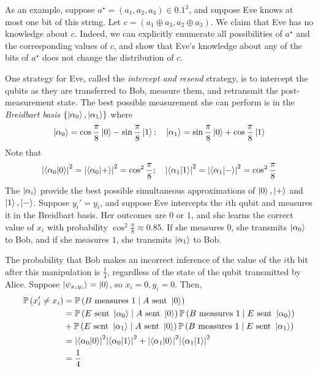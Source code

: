 As an example, suppose \( a^\star = (a_1, a_2, a_3) \in \qty{0,1}^3 \), and suppose Eve knows at most one bit of this string.
Let \( c = (a_1 \oplus a_3, a_2 \oplus a_3) \).
We claim that Eve has no knowledge about \( c \).
Indeed, we can explicitly enumerate all possibilities of \( a^\star \) and the corresponding values of \( c \), and show that Eve's knowledge about any of the bits of \( a^\star \) does not change the distribution of \( c \).

One strategy for Eve, called the \emph{intercept and resend} strategy, is to intercept the qubits as they are transferred to Bob, measure them, and retransmit the post-measurement state.
The best possible measurement she can perform is in the \emph{Breidbart basis} \( \qty{\ket{\alpha_0}, \ket{\alpha_1}} \) where
\[ \ket{\alpha_0} = \cos \frac{\pi}{8} \ket{0} - \sin \frac{\pi}{8} \ket{1};\quad \ket{\alpha_1} = \sin \frac{\pi}{8} \ket{0} + \cos \frac{\pi}{8} \ket{1} \]
Note that
\[ \abs{\ip{\alpha_0}{0}}^2 = \abs{\ip{\alpha_0}{+}}^2 = \cos^2 \frac{\pi}{8};\quad \abs{\ip{\alpha_1}{1}}^2 = \abs{\ip{\alpha_1}{-}}^2 = \cos^2 \frac{\pi}{8} \]
The \( \ket{\alpha_i} \) provide the best possible simultaneous approximations of \( \ket{0}, \ket{+} \) and \( \ket{1}, \ket{-} \).
Suppose \( y_i' = y_i \), and suppose Eve intercepts the \( i \)th qubit and measures it in the Breidbart basis.
Her outcomes are \( 0 \) or \( 1 \), and she learns the correct value of \( x_i \) with probability \( \cos^2 \frac{\pi}{8} \approx 0.85 \).
If she measures \( 0 \), she transmits \( \ket{\alpha_0} \) to Bob, and if she measures \( 1 \), she transmits \( \ket{\alpha_1} \) to Bob.

The probability that Bob makes an incorrect inference of the value of the \( i \)th bit after this manipulation is \( \frac{1}{4} \), regardless of the state of the qubit transmitted by Alice.
Suppose \( \ket{\psi_{x_i y_i}} = \ket{0} \), so \( x_i = 0, y_i = 0 \).
Then,
\begin{align*}
    \prob{x_i' \neq x_i} &= \prob{B \text{ measures } 1 \mid A \text{ sent } \ket{0}} \\
    &= \prob{E \text{ sent } \ket{\alpha_0} \mid A \text{ sent } \ket{0}} \prob{B \text{ measures } 1 \mid E \text{ sent } \ket{\alpha_0}} \\
    &+ \prob{E \text{ sent } \ket{\alpha_1} \mid A \text{ sent } \ket{0}} \prob{B \text{ measures } 1 \mid E \text{ sent } \ket{\alpha_1}} \\
    &= \abs{\ip{\alpha_0}{0}}^2 \abs{\ip{\alpha_0}{1}}^2 + \abs{\ip{\alpha_1}{0}}^2 \abs{\ip{\alpha_1}{1}}^2 \\
    &= \frac{1}{4}
\end{align*}
